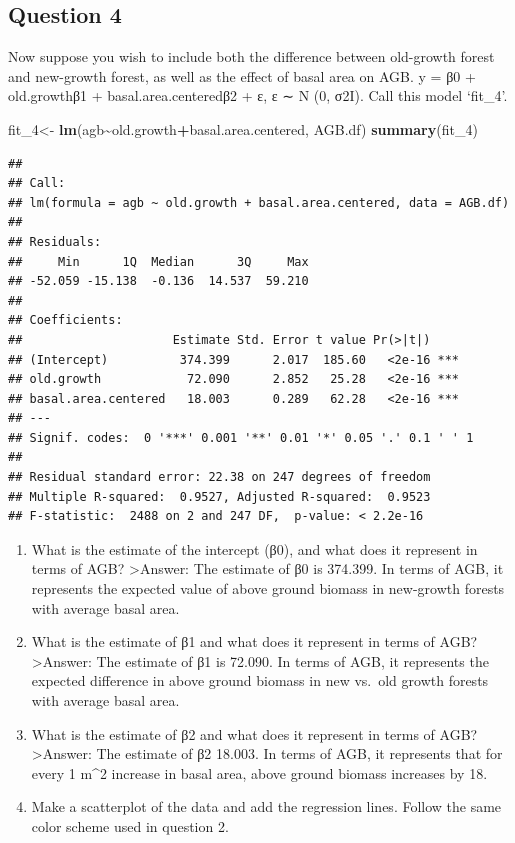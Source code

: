 \documentclass[
]{article}
\newenvironment{Shaded}{\begin{snugshade}}{\end{snugshade}}
\newcommand{\FunctionTok}[1]{\textcolor[rgb]{0.13,0.29,0.53}{\textbf{#1}}}
\newcommand{\NormalTok}[1]{#1}
\newcommand{\OtherTok}[1]{\textcolor[rgb]{0.56,0.35,0.01}{#1}}
\newcommand{\SpecialCharTok}[1]{\textcolor[rgb]{0.81,0.36,0.00}{\textbf{#1}}}
\begin{document}
\hypertarget{question-4}{%
\subsection{Question 4}\label{question-4}}

Now suppose you wish to include both the difference between old-growth
forest and new-growth forest, as well as the effect of basal area on
AGB. y = β0 + old.growthβ1 + basal.area.centeredβ2 + ε, ε ∼ N (0, σ2I).
Call this model `fit\_4'.

\begin{Shaded}
\begin{Highlighting}[]
\NormalTok{fit\_4}\OtherTok{\textless{}{-}} \FunctionTok{lm}\NormalTok{(agb}\SpecialCharTok{\textasciitilde{}}\NormalTok{old.growth}\SpecialCharTok{+}\NormalTok{basal.area.centered, AGB.df)}
\FunctionTok{summary}\NormalTok{(fit\_4)}
\end{Highlighting}
\end{Shaded}

\begin{verbatim}
## 
## Call:
## lm(formula = agb ~ old.growth + basal.area.centered, data = AGB.df)
## 
## Residuals:
##     Min      1Q  Median      3Q     Max 
## -52.059 -15.138  -0.136  14.537  59.210 
## 
## Coefficients:
##                     Estimate Std. Error t value Pr(>|t|)    
## (Intercept)          374.399      2.017  185.60   <2e-16 ***
## old.growth            72.090      2.852   25.28   <2e-16 ***
## basal.area.centered   18.003      0.289   62.28   <2e-16 ***
## ---
## Signif. codes:  0 '***' 0.001 '**' 0.01 '*' 0.05 '.' 0.1 ' ' 1
## 
## Residual standard error: 22.38 on 247 degrees of freedom
## Multiple R-squared:  0.9527, Adjusted R-squared:  0.9523 
## F-statistic:  2488 on 2 and 247 DF,  p-value: < 2.2e-16
\end{verbatim}

\begin{enumerate}
\def\labelenumi{\alph{enumi}.}
\item
  What is the estimate of the intercept (β0), and what does it represent
  in terms of AGB? \textgreater Answer: The estimate of β0 is 374.399.
  In terms of AGB, it represents the expected value of above ground
  biomass in new-growth forests with average basal area.
\item
  What is the estimate of β1 and what does it represent in terms of AGB?
  \textgreater Answer: The estimate of β1 is 72.090. In terms of AGB, it
  represents the expected difference in above ground biomass in new
  vs.~old growth forests with average basal area.
\item
  What is the estimate of β2 and what does it represent in terms of AGB?
  \textgreater Answer: The estimate of β2 18.003. In terms of AGB, it
  represents that for every 1 m\^{}2 increase in basal area, above
  ground biomass increases by 18.
\item
  Make a scatterplot of the data and add the regression lines. Follow
  the same color scheme used in question 2.
\end{enumerate}
\end{document}
